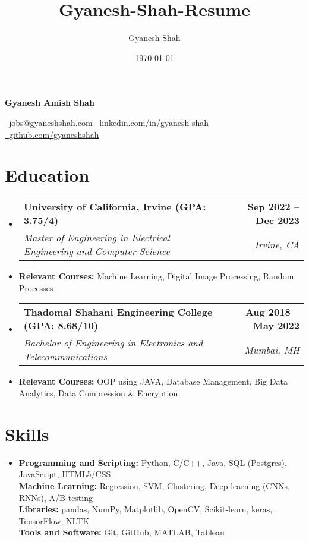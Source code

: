 \documentclass[letterpaper,11pt]{article}
\title{Gyanesh-Shah-Resume}
\author{Gyanesh Shah}
\date{\today}
\makeatletter
\newcommand{\resumeSubheading}[4]{
  \vspace{-2pt}\item
    \begin{tabular*}{1.0\textwidth}[t]{l@{\extracolsep{\fill}}r}
      \textbf{#1} & \textbf{\small #2} \\
      \textit{\small#3} & \textit{\small #4} \\
    \end{tabular*}\vspace{-7pt}
}
\newcommand{\resumeSubHeadingListStart}{\begin{itemize}[leftmargin=0.0in, label={}]}
\newcommand{\resumeSubHeadingListEnd}{\end{itemize}}
\makeatother
\begin{document}
\begin{center}
    \textbf{\Huge Gyanesh Amish Shah} \\ \vspace{-5pt}
\end{center}

\begin{center}
    \href{mailto:jobs@gyaneshshah.com}{\hspace{-0.5em} \ \small \underline{jobs@gyaneshshah.com} \quad} %
    \href{https://www.linkedin.com/in/gyanesh-shah/}{\hspace{-0.5em} \ \small \underline{linkedin.com/in/gyanesh-shah} \quad} %
    \href{https://github.com/gyaneshshah}{\hspace{-0.5em} \ \small \underline{github.com/gyaneshshah} \quad} %
\end{center}

\section{Education}
    \resumeSubHeadingListStart
        \resumeSubheading
            {University of California, Irvine (GPA: 3.75/4)}{Sep 2022 -- Dec 2023} 
            {Master of Engineering in Electrical Engineering and Computer Science}{Irvine, CA}
            \item{
            {\small\textbf{Relevant Courses:}{ Machine Learning, Digital Image Processing, Random Processes}
            }}
        \resumeSubheading
            {Thadomal Shahani Engineering College (GPA: 8.68/10)}{Aug 2018 -- May 2022}
            {Bachelor of Engineering in Electronics and Telecommunications}{Mumbai, MH}
            \item{
            {\small\textbf{Relevant Courses:}{ OOP using JAVA, Database Management, Big Data Analytics, Data Compression \& Encryption}
            }}

    \resumeSubHeadingListEnd

\section{Skills}
 \resumeSubHeadingListStart
   \item{
     \textbf{Programming and Scripting:}{ Python, C/C++, Java, SQL (Postgres), JavaScript, HTML5/CSS} \\
     \textbf{Machine Learning:}{ Regression, SVM, Clustering, Deep learning (CNNs, RNNs), A/B testing} \\
     \textbf{Libraries:}{ pandas, NumPy, Matplotlib, OpenCV, Scikit-learn, keras, TensorFlow, NLTK} \\
     \textbf{Tools and Software:}{ Git, GitHub, MATLAB, Tableau} 
   }
 \resumeSubHeadingListEnd
\end{document}
